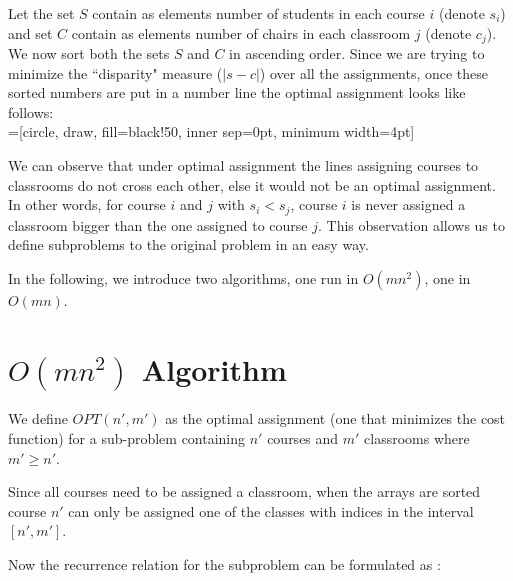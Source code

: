 
Let the set $S$ contain as elements number of students in each course $i$ (denote $s_i$) and set $C$ contain as elements number of chairs in each classroom $j$ (denote $c_j$). We now sort both the sets $S$ and $C$ in ascending order. Since we are trying to minimize the ``disparity" measure ($|s - c|$) over all the assignments, once these sorted numbers are put in a number line the optimal assignment looks like follows: \\



=[circle, draw, fill=black!50,
                        inner sep=0pt, minimum width=4pt]
\quad



We can observe that under optimal assignment the lines assigning courses to classrooms do not cross each other, else it would not be an optimal assignment. In other words, for course $i$ and $j$ with $s_i < s_j$, course $i$ is never assigned a classroom bigger than the one assigned to course $j$. This observation allows us to define subproblems to the original problem in an easy way.

In the following, we introduce two algorithms, one run in $O(mn^2)$, one in $O(mn)$.

\section{$O(mn^2)$ Algorithm}

We define $OPT(n', m')$ as the optimal assignment (one that minimizes the cost function) for a sub-problem containing $n'$ courses and $m'$ classrooms where $m' \geq n'$.



Since all courses need to be assigned a classroom, when the arrays are sorted course $n'$ can only be assigned one of the classes with indices in the interval $[n', m']$.

Now the recurrence relation for the subproblem can be formulated as :

